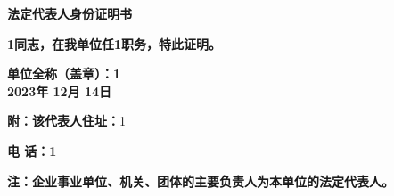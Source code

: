 \documentclass[12pt]{article}
\begin{document}
        \begin{center}
             \textbf{法定代表人身份证明书} %
        \end{center}

        \textbf{1同志，在我单位任1职务，特此证明。} \

        \begin{flushright}
            \textbf{单位全称（盖章）：1} \\
            \textbf{2023年 12月 14日}
        \end{flushright}
        
        \vspace{2\baselineskip} %
        \textbf{附：该代表人住址：}1 \

        \vspace{1\baselineskip} %
        \hspace*{22mm} \textbf{电 话：1} \

        

        \begin{flushleft}
            \small \textbf{注：企业事业单位、机关、团体的主要负责人为本单位的法定代表人。}
        \end{flushleft}

        
\end{document}
